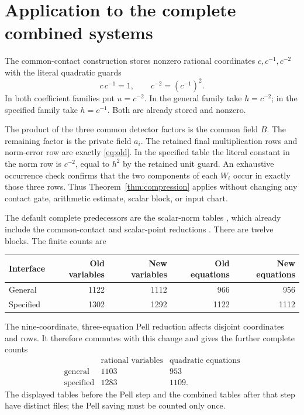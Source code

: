 \documentclass[11pt]{article}
\begin{document}
\section{Application to the complete combined systems}

The common-contact construction stores nonzero rational coordinates
\(c,c^{-1},c^{-2}\) with the literal quadratic guards
\[
                    c\,c^{-1}=1,\qquad c^{-2}=(c^{-1})^2.
\]
In both coefficient families put \(u=c^{-2}\). In the general
family take \(h=c^{-2}\); in the specified family take
\(h=c^{-1}\). Both are already stored and nonzero.

The product of the three common detector factors is the common
field \(B\). The remaining factor is the private field \(a_i\).
The retained final multiplication rows and norm-error row are
exactly \eqref{eq:old}. In the specified table the literal constant
in the norm row is \(c^{-2}\), equal to \(h^2\) by the retained
unit guard. An exhaustive occurrence check confirms that the two
components of each \(W_i\) occur in exactly those three rows.
Thus Theorem~\ref{thm:compression} applies without changing any
contact gate, arithmetic estimate, scalar block, or input chart.

The default complete predecessors are the scalar-norm tables
\cite{norm}, which already include the common-contact and
scalar-point reductions \cite{global,point}. There are twelve
blocks. The finite counts are
\begin{center}
\begin{tabular}{lrrrr}
\toprule
Interface & Old variables & New variables & Old equations & New equations\\
\midrule
General &1122&1112&966&956\\
Specified &1302&1292&1122&1112\\
\bottomrule
\end{tabular}
\end{center}

The nine-coordinate, three-equation Pell reduction
\cite{pell} affects disjoint coordinates and rows. It therefore
commutes with this change and gives the further complete counts
\[
 \begin{array}{c|cc}
 &\text{rational variables}&\text{quadratic equations}\\\hline
 \text{general}&1103&953\\
 \text{specified}&1283&1109.
 \end{array}
\]
The displayed tables before the Pell step and the combined tables
after that step have distinct files; the Pell saving must be counted
only once.
\end{document}
